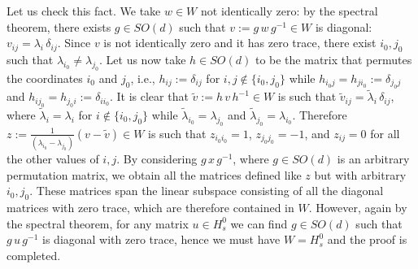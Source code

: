 \documentclass[a4paper,reqno,11pt]{amsart}
\numberwithin{equation}{section}
\newcommand{\gd}{\delta}
\newcommand{\gl}{\lambda}
\renewcommand{\tilde}{\widetilde}          %
\def\bE{\ensuremath{\bs{\mathrm{E}}}}
\def\bs{\boldsymbol}
\begin{document}
Let us check this fact. We take $w \in W$ not
identically zero: by the spectral theorem, there exists $g \in SO(d)$ such
that $v := g \, w \, g^{-1} \in W$ is diagonal: $v_{ij} = \gl_i \, \gd_{ij}$.
Since $v$ is not identically zero and it has zero trace, there exist
$i_0, j_0$ such that $\gl_{i_0} \ne \gl_{j_0}$. Let us now take $h \in SO(d)$
to be the matrix that permutes the coordinates $i_0$ and $j_0$, i.e.,
$h_{ij} := \gd_{ij}$ for $i,j \not \in \{i_0, j_0\}$ 
while $h_{i_0 j} = h_{j i_0} := \gd_{j_0 j}$
and $h_{i j_0} = h_{j_0 i} := \gd_{i i_0}$. It is clear that
$\tilde v := h \, v \, h^{-1} \in W$ 
is such that $\tilde v_{ij} = \tilde \gl_i\, \gd_{ij}$,
where $\tilde \gl_i = \gl_i$ for 
$i \not \in \{i_0, j_0\}$ while $\tilde \gl_{i_0} = \gl_{j_0}$
and $\tilde \gl_{j_0} = \gl_{i_0}$. Therefore 
$z :=\frac{1}{(\gl_{i_0} - \gl_{j_0})} (v - \tilde v) \in W$ is such that
$z_{i_0 i_0}=1$, $z_{j_0 j_0}=-1$, and $z_{ij}=0$ for all the other values of $i,j$.
By considering $g \, x \, g^{-1}$, where $g \in SO(d)$ is an 
arbitrary permutation matrix,
we obtain all the matrices defined like $z$ but with arbitrary $i_0, j_0$.
These matrices span the linear subspace consisting of all the diagonal matrices
with zero trace, which are therefore contained in $W$. However, again by the spectral
theorem, for any matrix $u \in H^0_s$ we can find $g \in SO(d)$ such that
$g \, u \, g^{-1}$ is diagonal with zero trace, hence we must have $W = H^0_s$
and the proof is completed.


\end{document}
